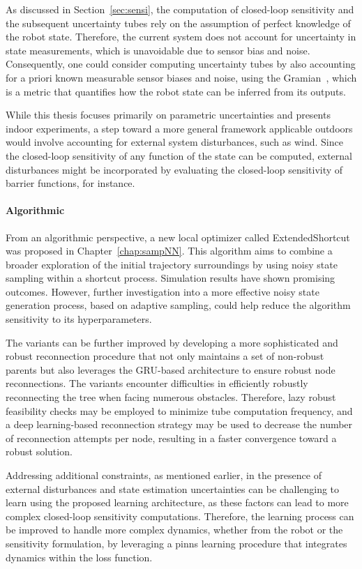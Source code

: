 As discussed in Section~\ref{sec:sensi}, the computation of closed-loop sensitivity and the subsequent uncertainty tubes rely on the assumption of perfect knowledge of the robot state. 
Therefore, the current system does not account for uncertainty in state measurements, which is unavoidable due to sensor bias and noise.
Consequently, one could consider computing uncertainty tubes by also accounting for a priori known measurable sensor biases and noise, using the Gramian~\cite{cGramian}, which is a metric that quantifies how the robot state can be inferred from its outputs.

While this thesis focuses primarily on parametric uncertainties and presents indoor experiments, a step toward a more general framework applicable outdoors would involve accounting for external system disturbances, such as wind.
Since the closed-loop sensitivity of any function of the state can be computed, external disturbances might be incorporated by evaluating the closed-loop sensitivity of barrier functions, for instance.

\paragraph{Algorithmic}

From an algorithmic perspective, a new local optimizer called ExtendedShortcut was proposed in Chapter~\ref{chap:sampNN}. 
This algorithm aims to combine a broader exploration of the initial trajectory surroundings by using noisy state sampling within a shortcut process. 
Simulation results have shown promising outcomes. 
However, further investigation into a more effective noisy state generation process, based on adaptive sampling, could help reduce the algorithm sensitivity to its hyperparameters.

The  variants can be further improved by developing a more sophisticated and robust reconnection procedure that not only maintains a set of non-robust parents but also leverages the GRU-based architecture to ensure robust node reconnections.
The  variants encounter difficulties in efficiently robustly reconnecting the tree when facing numerous obstacles. 
Therefore, lazy robust feasibility checks may be employed to minimize tube computation frequency, and a deep learning-based reconnection strategy may be used to decrease the number of reconnection attempts per node, resulting in a faster convergence toward a robust solution.

Addressing additional constraints, as mentioned earlier, in the presence of external disturbances and state estimation uncertainties can be challenging to learn using the proposed learning architecture, as these factors can lead to more complex closed-loop sensitivity computations.
Therefore, the learning process can be improved to handle more complex dynamics, whether from the robot or the sensitivity formulation, by leveraging a \gls{pinns} learning procedure that integrates  dynamics within the loss function.

